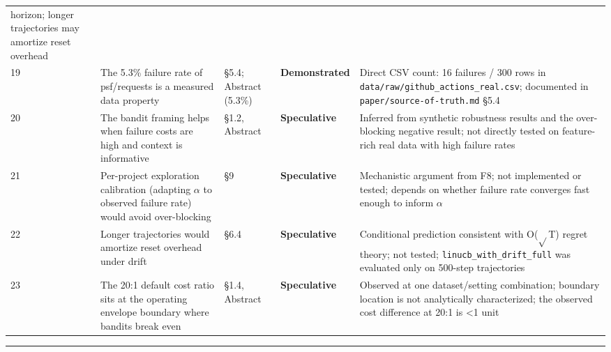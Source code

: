 \documentclass[10pt]{article}
\begin{document}
\begin{table}[ht]
\begin{tabular}{lllll}
horizon; longer trajectories may amortize reset overhead \\
19 & The 5.3\% failure rate of psf/requests is a measured data property
& §5.4; Abstract (5.3\%) & \textbf{Demonstrated} & Direct CSV count: 16
failures / 300 rows in \texttt{data/raw/github\_actions\_real.csv};
documented in \texttt{paper/source-of-truth.md} §5.4 \\
20 & The bandit framing helps when failure costs are high and context is
informative & §1.2, Abstract & \textbf{Speculative} & Inferred from
synthetic robustness results and the over-blocking negative result; not
directly tested on feature-rich real data with high failure rates \\
21 & Per-project exploration calibration (adapting $\alpha$ to observed failure
rate) would avoid over-blocking & §9 & \textbf{Speculative} &
Mechanistic argument from F8; not implemented or tested; depends on
whether failure rate converges fast enough to inform $\alpha$ \\
22 & Longer trajectories would amortize reset overhead under drift &
§6.4 & \textbf{Speculative} & Conditional prediction consistent with
O($\sqrt{}$T) regret theory; not tested; \texttt{linucb\_with\_drift\_full} was
evaluated only on 500-step trajectories \\
23 & The 20:1 default cost ratio sits at the operating envelope boundary
where bandits break even & §1.4, Abstract & \textbf{Speculative} &
Observed at one dataset/setting combination; boundary location is not
analytically characterized; the observed cost difference at 20:1 is
\textless1 unit \\
\end{tabular}\end{table}

\begin{center}\rule{0.5\linewidth}{0.5pt}\end{center}
\end{document}
